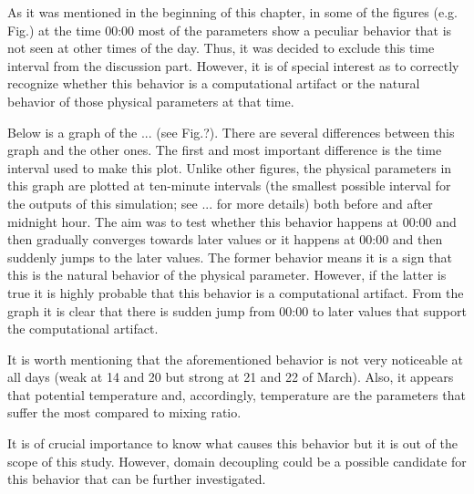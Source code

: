 \documentclass[a4paper,12pt]{article}
\numberwithin{equation}{section} %
\begin{document}
As it was mentioned in the beginning of this chapter, in some of the figures (e.g. Fig.) at the time 00:00 most of the parameters show a peculiar behavior that is not seen at other times of the day. Thus, it was decided to exclude this time interval from the discussion part. However, it is of special interest as to correctly recognize whether this behavior is a computational artifact or the natural behavior of those physical parameters at that time. 

Below is a graph of the ... (see Fig.?). There are several differences between this graph and the other ones. The first and most important difference is the time interval used to make this plot. Unlike other figures, the physical parameters in this graph are plotted at ten-minute intervals (the smallest possible interval for the outputs of this simulation; see ... for more details) both before and after midnight hour. The aim was to test whether this behavior happens at 00:00 and then gradually converges towards later values or it happens at 00:00 and then suddenly jumps to the later values. The former behavior means it is a sign that this is the natural behavior of the physical parameter. However, if the latter is true it is highly probable that this behavior is a computational artifact. From the graph it is clear that there is sudden jump from 00:00 to later values that support the computational artifact.

It is worth mentioning that the aforementioned behavior is not very noticeable at all days (weak at 14 and 20 but strong at 21 and 22 of March). Also, it appears that potential temperature and, accordingly, temperature are the parameters that suffer the most compared to mixing ratio.

It is of crucial importance to know what causes this behavior but it is out of the scope of this study. However, domain decoupling could be a possible candidate for this behavior that can be further investigated.






\end{document}
